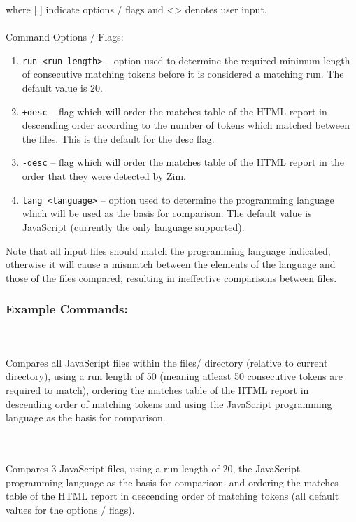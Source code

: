 \documentclass[11pt, a4paper]{article}
\begin{document}
\bigskip

\noindent where [ ] indicate options / flags and \textless\textgreater\hspace{0.1cm} denotes user input. 
\\
\\
Command Options / Flags:

\begin{enumerate}
	\item {\tt run <run length>} -- option used to determine the required minimum length of consecutive matching tokens before it is considered a matching run. The default value is 20.
	\item {\tt +desc} -- flag which will order the matches table of the HTML report in descending order according to the number of tokens which matched between the files. This is the default for the desc flag.
	\item {\tt -desc} -- flag which will order the matches table of the HTML report in the order that they were detected by Zim.
	\item {\tt lang <language>} -- option used to determine the programming language which will be used as the basis for comparison. The default value is JavaScript (currently the only language supported). 
\end{enumerate}

\noindent Note that all input files should match the programming language indicated, otherwise it will cause a mismatch between the elements of the language and those of the files compared, resulting in ineffective comparisons between files.

\subsubsection{Example Commands: }

\\
\\
Compares all JavaScript files within the files/ directory (relative to current directory), using a run length of 50 (meaning atleast 50 consecutive tokens are required to match), ordering the matches table of the HTML report in descending order of matching tokens and using the JavaScript programming language as the basis for comparison.

\bigskip

\\
\\
Compares 3 JavaScript files, using a run length of 20, the JavaScript programming language as the basis for comparison, and ordering the matches table of the HTML report in descending order of matching tokens (all default values for the options / flags).
\end{document}
